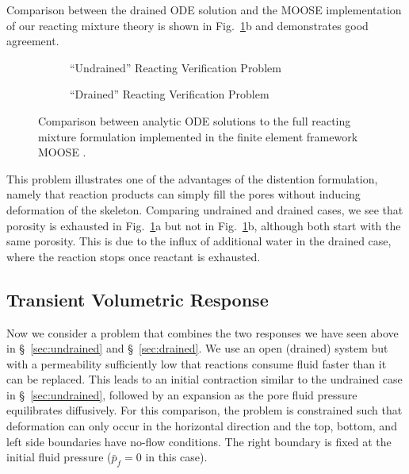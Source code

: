 \documentclass[11pt]{article}
\begin{document}
Comparison between the drained ODE solution and the MOOSE implementation of our reacting mixture theory is shown in Fig.~\ref{fig:swiss_cheese}b and demonstrates good agreement.

\begin{figure}[htbp]
  \centering
  \begin{subfigure}[t]{0.48\textwidth}
    \vspace{0pt}
    \centering
    \resizebox{\linewidth}{!}{}
    \caption{``Undrained'' Reacting Verification Problem}
  \end{subfigure}
  \hfill
  \begin{subfigure}[t]{0.48\textwidth}
    \vspace{0pt}
    \centering
    \resizebox{\linewidth}{!}{}
    \caption{``Drained'' Reacting Verification Problem}
  \end{subfigure}
  \caption{Comparison between analytic ODE solutions to the full reacting mixture formulation implemented in the finite element framework MOOSE \cite{harbour2025moose}.}
\label{fig:swiss_cheese}
\end{figure}
This problem illustrates one of the advantages of the distention formulation, namely that reaction products can simply fill the pores without inducing deformation of the skeleton. Comparing undrained and drained cases, we see that porosity is exhausted in Fig.~\ref{fig:swiss_cheese}a but not in Fig.~\ref{fig:swiss_cheese}b, although both start with the same porosity. This is due to the influx of additional water in the drained case, where the reaction stops once reactant is exhausted.

\subsection{Transient Volumetric Response}\label{sec:transient}
Now we consider a problem that combines the two responses we have seen above in \S~\ref{sec:undrained} and \S~\ref{sec:drained}. We use an open (drained) system but with a permeability sufficiently low that reactions consume fluid faster than it can be replaced. This leads to an initial contraction similar to the undrained case in \S~\ref{sec:undrained}, followed by an expansion as the pore fluid pressure equilibrates diffusively. For this comparison, the problem is constrained such that deformation can only occur in the horizontal direction and the top, bottom, and left side boundaries have no-flow conditions.  The right boundary is fixed at the initial fluid pressure ($\bar{p}_f = 0$ in this case).
\end{document}

